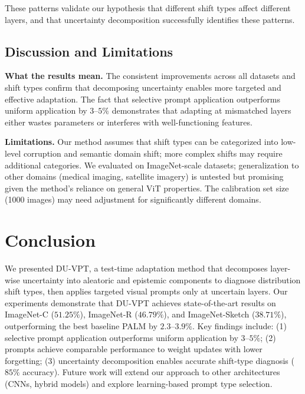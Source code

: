 \documentclass[11pt,a4paper]{article}
\begin{document}
These patterns validate our hypothesis that different shift types affect different layers, and that uncertainty decomposition successfully identifies these patterns.

\subsection{Discussion and Limitations}

\textbf{What the results mean.} The consistent improvements across all datasets and shift types confirm that decomposing uncertainty enables more targeted and effective adaptation. The fact that selective prompt application outperforms uniform application by $3$--$5\%$ demonstrates that adapting at mismatched layers either wastes parameters or interferes with well-functioning features.

\textbf{Limitations.} Our method assumes that shift types can be categorized into low-level corruption and semantic domain shift; more complex shifts may require additional categories. We evaluated on ImageNet-scale datasets; generalization to other domains (medical imaging, satellite imagery) is untested but promising given the method's reliance on general ViT properties. The calibration set size (1000 images) may need adjustment for significantly different domains.

\section{Conclusion}

We presented DU-VPT, a test-time adaptation method that decomposes layer-wise uncertainty into aleatoric and epistemic components to diagnose distribution shift types, then applies targeted visual prompts only at uncertain layers. Our experiments demonstrate that DU-VPT achieves state-of-the-art results on ImageNet-C ($51.25\%$), ImageNet-R ($46.79\%$), and ImageNet-Sketch ($38.71\%$), outperforming the best baseline PALM by $2.3$--$3.9\%$. Key findings include: (1) selective prompt application outperforms uniform application by $3$--$5\%$; (2) prompts achieve comparable performance to weight updates with lower forgetting; (3) uncertainty decomposition enables accurate shift-type diagnosis ($85\%$ accuracy). Future work will extend our approach to other architectures (CNNs, hybrid models) and explore learning-based prompt type selection.
\end{document}
